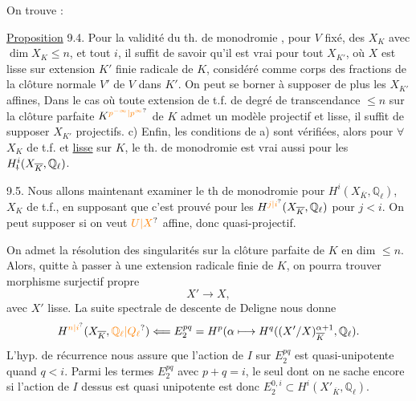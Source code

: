 On trouve :

\uline{Proposition} 9.4.  Pour  la validité du th. de monodromie , pour $V$ fixé,  des $X_K$ avec $\dim X_K\leq n$, et tout $i$, il suffit de savoir qu'il est vrai pour tout $X_{K'}$, où $X$ est lisse  sur   extension $K'$ finie radicale de $K$, considéré comme corps des fractions de la clôture normale $V'$ de $V$ dans $K'$.  On peut  se borner à supposer de plus les $X_{K'}$ affines,   Dans le cas où  toute extension de t.f. de degré de transcendance $\leq n$ sur la clôture parfaite $K^{\unsure{p^{-\infty}|p^\infty}}$ de $K$ admet un modèle projectif et lisse, il suffit de supposer  $X_{K'}$ projectifs. c) Enfin,  les conditions   de a) sont vérifiées, alors pour $\forall$ $X_K$ de t.f. et \uline{lisse} sur $K$,  le th. de monodromie est vrai aussi pour les $H^i_{\deleted{!}}(X_{\overline K},\mathbb Q_\ell)$.

9.5. Nous allons maintenant examiner le th de monodromie pour $H^i(X_{\overline K},\mathbb Q_\ell)$,   $X_K$ de t.f., en supposant que  c'est prouvé pour les  $H^{\unsure{j|i}}(X_{\overline K},\mathbb Q_\ell)$ pour $j<i$.
On peut supposer si on veut $\unsure{U|X}$ affine, donc quasi-projectif.

 On admet  la résolution des singularités sur la clôture parfaite  de $K$ en dim $\leq n$. Alors, quitte à passer à une extension radicale finie de $K$, on pourra trouver  morphisme surjectif  propre 
\[
X'\longrightarrow X,
\]
avec $X'$ lisse.  La suite spectrale de descente de Deligne nous donne
\[
H^{\unsure{n|i}}(X_{\overline K},\unsure{\mathbb Q_\ell|Q_\ell})\Longleftarrow E^{pq}_2=H^p(\alpha\longmapsto H^q((X'/X)^{\alpha+1}_{\overline K},\mathbb Q_\ell).
\]
 
 L'hyp. de récurrence nous assure que  l'action de $I$ sur $E^{pq}_2$ est quasi-unipotente quand $q<i$.  Parmi les termes $E^{pq}_2$ avec $p+q=i$, le seul dont on ne sache encore  si l'action de $I$ dessus est quasi unipotente est donc $E^{0,i}_2\subset H^i(X'_{\overline K},\mathbb Q_\ell)$.

